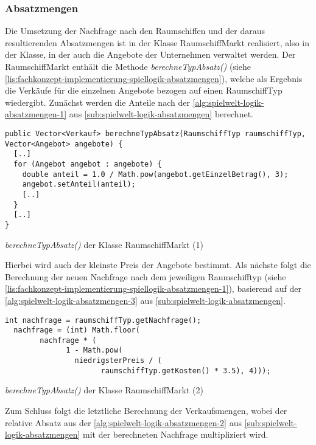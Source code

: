 \subsubsection{Absatzmengen}
\label{subsub:fachkonzept-implementierung-spiellogik-absatzmengen}

Die Umsetzung der Nachfrage nach den Raumschiffen und der daraus resultierenden Absatzmengen ist in der Klasse RaumschiffMarkt realisiert, also in der Klasse, in der auch die Angebote der Unternehmen verwaltet werden. Der RaumschiffMarkt enthält die Methode \textit{berechneTypAbsatz()} (siehe \ref{lis:fachkonzept-implementierung-spiellogik-absatzmengen}), welche als Ergebnis die Verkäufe für die einzelnen Angebote bezogen auf einen RaumschiffTyp wiedergibt. 
Zunächst werden die Anteile nach der \ref{alg:spielwelt-logik-absatzmengen-1} aus \ref{sub:spielwelt-logik-absatzmengen} berechnet.

\begin{programm}[htbp]
\begin{lstlisting}[breaklines=true]
public Vector<Verkauf> berechneTypAbsatz(RaumschiffTyp raumschiffTyp, Vector<Angebot> angebote) {
  [..]
  for (Angebot angebot : angebote) {
    double anteil = 1.0 / Math.pow(angebot.getEinzelBetrag(), 3);
	angebot.setAnteil(anteil);
	[..]
  }
  [..]
}
\end{lstlisting}
\caption{\textit{berechneTypAbsatz()} der Klasse RaumschiffMarkt (1)\label{lis:fachkonzept-implementierung-spiellogik-absatzmengen}}
\end{programm}

Hierbei wird auch der kleinste Preis der Angebote bestimmt. Als nächste folgt die Berechnung der neuen Nachfrage nach dem jeweiligen Raumschifftyp (siehe \ref{lis:fachkonzept-implementierung-spiellogik-absatzmengen-1}), basierend auf der \ref{alg:spielwelt-logik-absatzmengen-3} aus \ref{sub:spielwelt-logik-absatzmengen}.

\begin{programm}[htbp]
\begin{lstlisting}[breaklines=true]
  int nachfrage = raumschiffTyp.getNachfrage();
  nachfrage = (int) Math.floor(
  		nachfrage * (
          	  1 - Math.pow(
           	    niedrigsterPreis / (
              	      raumschiffTyp.getKosten() * 3.5), 4)));
\end{lstlisting}
\caption{\textit{berechneTypAbsatz()} der Klasse RaumschiffMarkt (2)\label{lis:fachkonzept-implementierung-spiellogik-absatzmengen-1}}
\end{programm}

Zum Schluss folgt die letztliche Berechnung der Verkaufsmengen, wobei der relative Absatz aus der \ref{alg:spielwelt-logik-absatzmengen-2} aus \ref{sub:spielwelt-logik-absatzmengen} mit der berechneten Nachfrage multipliziert wird. 




